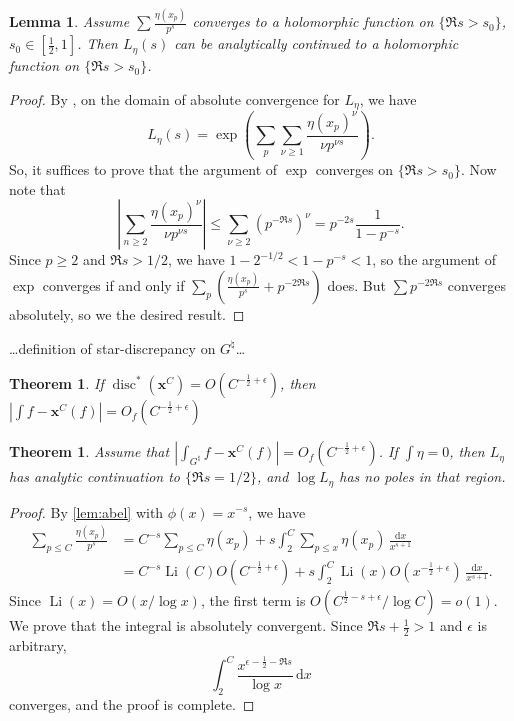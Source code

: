 \documentclass{article}
\DeclareMathOperator{\disc}{disc}
\DeclareMathOperator{\Li}{Li}
\newcommand{\bx}{\boldsymbol{x}}
\newcommand{\dd}{\mathrm{d}}
\newtheorem{theorem}[subsection]{Theorem}
\newtheorem{lemma}[subsection]{Lemma}
\theoremstyle{definition}
\begin{document}
\begin{lemma}
Assume $\sum \frac{\eta(x_p)}{p^s}$ converges to a holomorphic function on  
$\{\Re s>s_0\}$, $s_0\in \left[\frac 1 2, 1\right]$. Then $L_\eta(s)$ can be 
analytically continued to a holomorphic function on $\{\Re s > s_0\}$. 
\end{lemma}
\begin{proof}
By \cite[11.9, Ex.~2]{apostol-1976}, on the domain of absolute convergence for 
$L_\eta$, we have 
\[
	L_\eta(s) = \exp\left(\sum_p \sum_{\nu\geqslant 1} \frac{\eta(x_p)^\nu}{\nu p^{\nu s}}\right) .
\]
So, it suffices to prove that the argument of $\exp$ converges on 
$\{\Re s>s_0\}$. Now note that 
\[
	\left|\sum_{n\geqslant 2} \frac{\eta(x_p)^\nu}{\nu p^{\nu s}}\right|
		\leqslant \sum_{\nu\geqslant 2} (p^{-\Re s})^\nu 
		= p^{-2 s} \frac{1}{1-p^{-s}} .
\]
Since $p\geqslant 2$ and $\Re s>1/2$, we have $1-2^{-1/2}<1-p^{-s}<1$, so the 
argument of $\exp$ converges if and only if 
$\sum_p \left(\frac{\eta(x_p)}{p^s} + p^{-2\Re s}\right)$ does. But 
$\sum p^{-2\Re s}$ converges absolutely, so we the desired result. 
\end{proof}

\ldots definition of star-discrepancy on $G^\natural$\ldots

\begin{theorem}
If $\disc^\ast(\bx^C) = O(C^{-\frac 1 2+\epsilon})$, then 
$\left|\int f - \bx^C(f)\right| = O_f(C^{-\frac 1 2+\epsilon})$
\end{theorem}

\begin{theorem}
Assume that $\left|\int_{G^\natural} f - \bx^C(f)\right| = O_f(C^{-\frac 1 2+\epsilon})$. 
If $\int \eta = 0$, then $L_\eta$ has analytic continuation to $\{\Re s=1/2\}$, and 
$\log L_\eta$ has no poles in that region. 

\end{theorem}
\begin{proof}
By \autoref{lem:abel} with $\phi(x)=x^{-s}$, we have 
\begin{align*}
	\sum_{p\leqslant C} \frac{\eta(x_p)}{p^s} 
		&= C^{-s} \sum_{p\leqslant C} \eta(x_p) + s \int_2^C \sum_{p\leqslant x} \eta(x_p)\, \frac{\dd x}{x^{s+1}} \\
		&= C^{-s}\Li(C) O(C^{-\frac 1 2+\epsilon}) + s \int_2^C \Li(x) O(x^{-\frac 1 2+\epsilon})\, \frac{\dd x}{x^{s+1}} .
\end{align*}
Since $\Li(x)=O(x/\log x)$, the first term is 
$O(C^{\frac 1 2 -s+\epsilon}/\log C) = o(1)$. We prove that the integral is 
absolutely convergent. Since $\Re s+\frac 1 2>1$ and $\epsilon$ is arbitrary, 
\[
	\int_2^C \frac{x^{\epsilon-\frac 1 2-\Re s}}{\log x}\, \dd x
\]
converges, and the proof is complete. 
\end{proof}





\printbibliography
\end{document}
